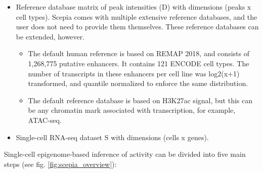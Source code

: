 \begin{itemize}
	\item Reference database matrix of peak intensities (D) with dimensions (peaks x cell types). Scepia comes with multiple extensive reference databases, and the user does not need to provide them themselves. These reference databases can be extended, however.
    \begin{itemize}
        \item The default human reference is based on REMAP 2018\cite{Chneby2017}, and consists of 1,268,775 putative enhancers. It contains 121 ENCODE\cite{encode_dcc} cell types. The number of transcripts in these enhancers per cell line was log2(x+1) transformed, and quantile normalized\cite{qnorm} to enforce the same distribution.
        \item The default reference database is based on H3K27ac signal, but this can be any chromatin mark associated with transcription, for example, ATAC-seq.
    \end{itemize}
	\item Single-cell RNA-seq dataset S with dimensions (cells x genes). 
\end{itemize}

\noindent
Single-cell epigenome-based inference of activity can be divided into five main steps (see fig. \ref{fig:scepia_overview}):

